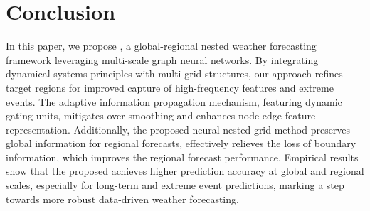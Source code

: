 \section{Conclusion}
In this paper, we propose \method{}, a global-regional nested weather forecasting framework leveraging multi-scale graph neural networks. By integrating dynamical systems principles with multi-grid structures, our approach refines target regions for improved capture of high-frequency features and extreme events. The adaptive information propagation mechanism, featuring dynamic gating units, mitigates over-smoothing and enhances node-edge feature representation. Additionally, the proposed neural nested grid method preserves global information for regional forecasts, effectively relieves the loss of boundary information, which improves the regional forecast performance. Empirical results show that the proposed \method{} achieves higher prediction accuracy at global and regional scales, especially for long-term and extreme event predictions, marking a step towards more robust data-driven weather forecasting.